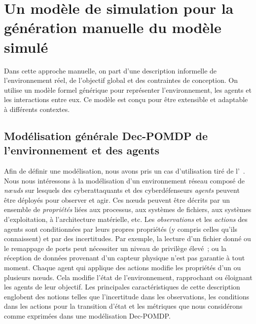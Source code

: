 \section{Un modèle de simulation pour la génération manuelle du modèle simulé}

Dans cette approche manuelle, on part d'une description informelle de l'environnement réel, de l'objectif global et des contraintes de conception. On utilise un modèle formel générique pour représenter l'environnement, les agents et les interactions entre eux. Ce modèle est conçu pour être extensible et adaptable à différents contextes.

\subsection{Modélisation générale Dec-POMDP de l'environnement et des agents}


Afin de définir une modélisation, nous avons pris un cas d'utilisation tiré de l'~\cite{theron_autonomous_2021}. Nous nous intéressons à la modélisation d'un environnement réseau composé de \textit{nœuds} sur lesquels des cyberattaquants et des cyberdéfenseurs \textit{agents} peuvent être déployés pour observer et agir. Ces nœuds peuvent être décrits par un ensemble de \textit{propriétés} liées aux processus, aux systèmes de fichiers, aux systèmes d'exploitation, à l'architecture matérielle, etc.
Les \textit{observations} et les \textit{actions} des agents sont conditionnées par leurs propres propriétés (y compris celles qu'ils connaissent) et par des incertitudes. Par exemple, la lecture d'un fichier donné ou le remappage de ports peut nécessiter un niveau de privilège élevé~; ou la réception de données provenant d'un capteur physique n'est pas garantie à tout moment.
Chaque agent qui applique des actions modifie les propriétés d'un ou plusieurs nœuds. Cela modifie l'état de l'environnement, rapprochant ou éloignant les agents de leur objectif.
Les principales caractéristiques de cette description englobent des notions telles que l'incertitude dans les observations, les conditions dans les actions pour la transition d'état et les métriques que nous considérons comme exprimées dans une modélisation Dec-POMDP.

